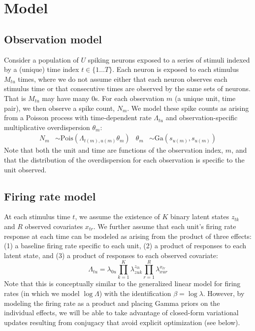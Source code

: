 \documentclass[10pt,letterpaper]{article}
\begin{document}
\section*{Model}
\label{model_sec}

\subsection*{Observation model}
Consider a population of $U$ spiking neurons exposed to a series of stimuli indexed by a (unique) time index $t\in \lbrace 1\ldots T\rbrace$. Each neuron is exposed to each stimulus $M_{tu}$ times, where we do not assume either that each neuron observes each stimulus time or that consecutive times are observed by the same sets of neurons. That is $M_{tu}$ may have many 0s. For each observation $m$ (a unique unit, time pair), we then observe a spike count, $N_m$. We model these spike counts as arising from a Poisson process with time-dependent rate $\Lambda_{tu}$ and observation-specific multiplicative overdispersion $\theta_m$:
\begin{align}
    \label{obs_model}
    N_{m} &\sim \text{Pois}(\Lambda_{t(m), u(m)} \theta_m) &
    \theta_m &\sim \text{Ga}(s_{u(m)}, s_{u(m)})
\end{align}
Note that both the unit and time are functions of the observation index, $m$, and that the distribution of the overdispersion for each observation is specific to the unit observed. 

\subsection*{Firing rate model}
At each stimulus time $t$, we assume the existence of $K$ binary latent states $z_{tk}$ and $R$ observed covariates $x_{tr}$. We further assume that each unit's firing rate response at each time can be modeled as arising from the product of three effects: (1) a baseline firing rate specific to each unit, (2) a product of responses to each latent state, and (3) a product of responses to each observed covariate:
\begin{equation}
    \label{fr_model}
    \Lambda_{tu} = \lambda_{0u} \prod_{k = 1}^K \lambda_{zuk}^{z_{tk}}  
    \prod_{r = 1}^R \lambda_{xur}^{x_{tr}}   
\end{equation} 
Note that this is conceptually similar to the generalized linear model for firing rates (in which we model $\log \Lambda$) with the identification $\beta = \log \lambda$. However, by modeling the firing rate as a product and placing Gamma priors on the individual effects, we will be able to take advantage of closed-form variational updates resulting from conjugacy that avoid explicit optimization (see below). 
\end{document}

